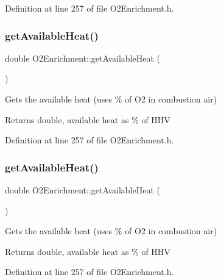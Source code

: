 Definition at line 257 of file O2\+Enrichment.\+h.

\mbox{\label{class_o2_enrichment_ac34e93c7e1444ab81a621428f0eee4d3}} 
\subsubsection{\texorpdfstring{get\+Available\+Heat()}{getAvailableHeat()}\hspace{0.1cm}{\footnotesize\ttfamily [2/3]}}
{\footnotesize\ttfamily double O2\+Enrichment\+::get\+Available\+Heat (\begin{DoxyParamCaption}{ }\end{DoxyParamCaption})\hspace{0.3cm}{\ttfamily [inline]}}

Gets the available heat (uses \% of O2 in combustion air) \begin{DoxyReturn}{Returns}
double, available heat as \% of H\+HV 
\end{DoxyReturn}


Definition at line 257 of file O2\+Enrichment.\+h.

\mbox{\label{class_o2_enrichment_ac34e93c7e1444ab81a621428f0eee4d3}} 
\subsubsection{\texorpdfstring{get\+Available\+Heat()}{getAvailableHeat()}\hspace{0.1cm}{\footnotesize\ttfamily [3/3]}}
{\footnotesize\ttfamily double O2\+Enrichment\+::get\+Available\+Heat (\begin{DoxyParamCaption}{ }\end{DoxyParamCaption})\hspace{0.3cm}{\ttfamily [inline]}}

Gets the available heat (uses \% of O2 in combustion air) \begin{DoxyReturn}{Returns}
double, available heat as \% of H\+HV 
\end{DoxyReturn}


Definition at line 257 of file O2\+Enrichment.\+h.

